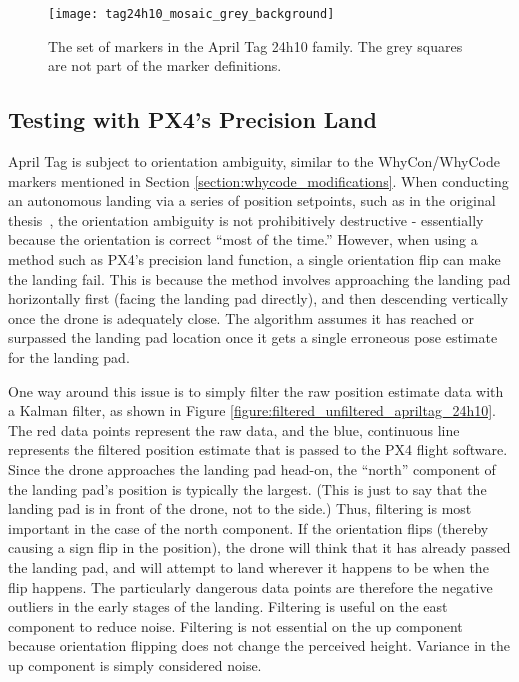 \begin{figure}
    \centering
    \texttt{[image: tag24h10\_mosaic\_grey\_background]}
    \caption{The set of markers in the April Tag 24h10 family. The grey squares are not part of the marker definitions.}
    \label{figure:apriltag24h10}
\end{figure}

\subsection{Testing with PX4's Precision Land}

April Tag is subject to orientation ambiguity, similar to the WhyCon/WhyCode markers mentioned in Section \ref{section:whycode_modifications}.
When conducting an autonomous landing via a series of position setpoints, such as in the original thesis~\cite{joshua_master_thesis},
the orientation ambiguity is not prohibitively destructive - essentially because the orientation is correct ``most of the time.''
However, when using a method such as PX4's precision land function, a single orientation flip can make the landing fail.
This is because the method involves approaching the landing pad horizontally first (facing the landing pad directly),
and then descending vertically once the drone is adequately close.
The algorithm assumes it has reached or surpassed the landing pad location once it gets a single erroneous pose estimate for the landing pad.

One way around this issue is to simply filter the raw position estimate data with a Kalman filter, as shown in Figure \ref{figure:filtered_unfiltered_apriltag_24h10}.
The red data points represent the raw data, and the blue, continuous line represents the filtered position estimate
that is passed to the PX4 flight software.
Since the drone approaches the landing pad head-on, the ``north'' component of the landing pad's position is typically
the largest.
(This is just to say that the landing pad is in front of the drone, not to the side.)
Thus, filtering is most important in the case of the north component.
If the orientation flips (thereby causing a sign flip in the position),
the drone will think that it has already passed the landing pad, and will attempt to land wherever it happens to be
when the flip happens.
The particularly dangerous data points are therefore the negative outliers in the early stages of the landing.
Filtering is useful on the east component to reduce noise.
Filtering is not essential on the up component because orientation flipping does not change the perceived height.
Variance in the up component is simply considered noise.


